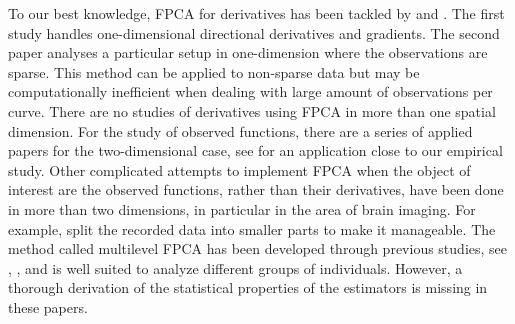 To our best knowledge, FPCA for derivatives has been tackled by \cite{Hall:09} and \cite{Mueller:2009}. The first study handles one-dimensional directional derivatives and gradients. The second paper analyses a particular setup in one-dimension where the observations are sparse. This method can be applied to non-sparse data but may be computationally inefficient when dealing with large amount of observations per curve. There are no studies of derivatives using FPCA in more than one spatial dimension. For the study of observed functions, there are a series of applied papers for the two-dimensional case, see \cite{Cont:02} for an application close to our empirical study. Other complicated attempts to implement FPCA when the object of interest are the observed functions, rather than their derivatives, have been done in more than two dimensions, in particular in the area of brain imaging. For example, \cite{Zipunnikov:11} split the recorded data into smaller parts to make it manageable. The method called multilevel FPCA has been developed through previous studies, see \cite{Staicu01042010}, \cite{di2009multilevel}, and is well suited to analyze different groups of individuals. However, a thorough derivation of the statistical properties of the estimators is missing in these papers.




